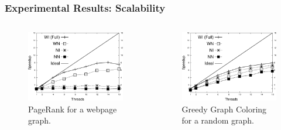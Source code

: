 \documentclass{beamer}
\begin{document}
\begin{frame}[fragile]
   \frametitle{Experimental Results: Scalability}
   \begin{columns}[t]
      \begin{figure}[b]
         \includegraphics[width=\textwidth]{../figures/results-pagerank-search-engines.pdf}
         \caption{PageRank for a webpage graph.}
      \end{figure}
      \begin{figure}[b]
         \includegraphics[width=\textwidth]{../figures/results-ggc.pdf}
         \caption{Greedy Graph Coloring for a random graph.}
      \end{figure}
   \end{columns}
\end{frame}
\end{document}
